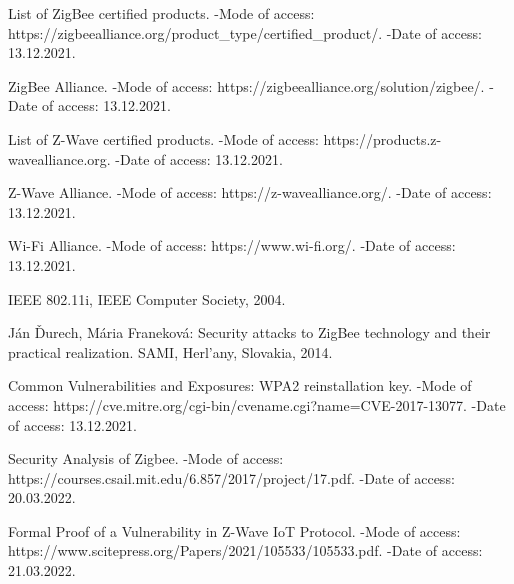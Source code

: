 \newpage
 	
	 \begin{thebibliography}{1}
	 	
	 	 List of ZigBee certified products. -Mode of access: 
	 	\newline https://zigbeealliance.org/product\_type/certified\_product/. -Date of access: 13.12.2021.
	 	
	 	 ZigBee Alliance. -Mode of access: 
	 	\newline https://zigbeealliance.org/solution/zigbee/. -Date of access: 13.12.2021.
	 	
	 	 List of Z-Wave certified products. -Mode of access: 
	 	\newline https://products.z-wavealliance.org. -Date of access: 13.12.2021.
	 	
	 	 Z-Wave Alliance. -Mode of access: 
	 	\newline https://z-wavealliance.org/. -Date of access: 13.12.2021.
	 	
	 	 Wi-Fi Alliance. -Mode of access: 
	 	\newline https://www.wi-fi.org/. -Date of access: 13.12.2021.
	 	
	 	 IEEE 802.11i, IEEE Computer Society, 2004.
	 	
	 	 Ján Ďurech, Mária Franeková: Security attacks to ZigBee technology and their practical realization. 
	 	SAMI,  Herl’any, Slovakia, 2014.
	 	
	 	 Common Vulnerabilities and Exposures: WPA2 reinstallation key. -Mode of access: 
	    https://cve.mitre.org/cgi-bin/cvename.cgi?name=CVE-2017-13077.  \newline -Date of access: 13.12.2021.
	    
	     Security Analysis of Zigbee. -Mode of access: \newline
	    https://courses.csail.mit.edu/6.857/2017/project/17.pdf. -Date of access: 20.03.2022.
	    
	     Formal Proof of a Vulnerability in Z-Wave IoT Protocol. -Mode of access: \newline
	    https://www.scitepress.org/Papers/2021/105533/105533.pdf. -Date of access: 21.03.2022.
	 	
	 \end{thebibliography}